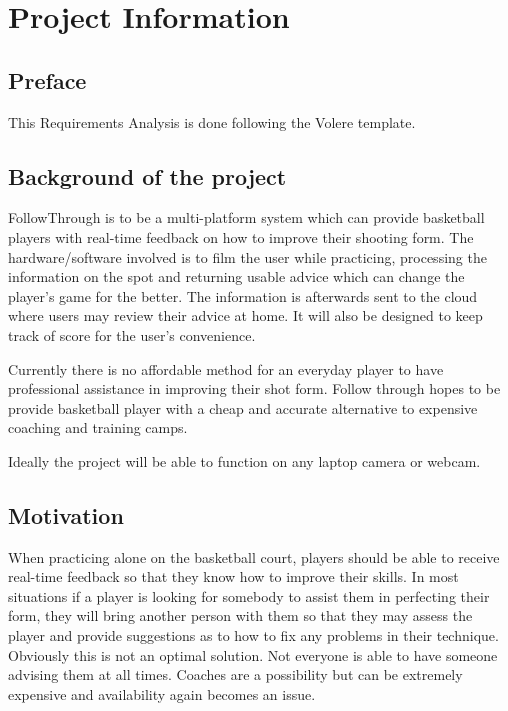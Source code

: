 \chapter{Project Information}

\section{Preface}
This Requirements Analysis is done following the Volere template.

\section{Background of the project}
\hspace*{4mm}FollowThrough is to be a multi-platform system which can provide basketball players with real-time feedback on how to improve their shooting form. The hardware/software involved is to film the user while practicing, processing the information on the spot and returning usable advice which can change the player’s game for the better. The information is afterwards sent to the cloud where users may review their advice at home. It will also be designed to keep track of score for the user’s convenience.

Currently there is no affordable method for an everyday player to have professional assistance in improving their shot form. Follow through hopes to be provide basketball player with a cheap and accurate alternative to expensive coaching and training camps.

Ideally the project will be able to function on any laptop camera or webcam.

\section{Motivation}
\hspace*{4mm}When practicing alone on the basketball court, players should be able to receive real-time feedback so that they know how to improve their skills. In most situations if a player is looking for somebody to assist them in perfecting their form, they will bring another person with them so that they may assess the player and provide suggestions as to how to fix any problems in their technique. Obviously this is not an optimal solution. Not everyone is able to have someone advising them at all times. Coaches are a possibility but can be extremely expensive and availability again becomes an issue.


